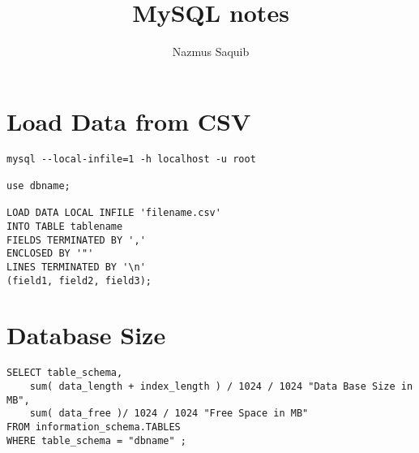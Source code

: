 \documentclass[12pt, a4paper]{article}
\begin{document}
\title{MySQL notes}
\author{Nazmus Saquib}

\maketitle
\tableofcontents

\section{Load Data from CSV}
\begin{verbatim}
mysql --local-infile=1 -h localhost -u root

use dbname;

LOAD DATA LOCAL INFILE 'filename.csv'
INTO TABLE tablename
FIELDS TERMINATED BY ','
ENCLOSED BY '"'
LINES TERMINATED BY '\n'
(field1, field2, field3);
\end{verbatim}

\section{Database Size}
\begin{verbatim}
SELECT table_schema,
    sum( data_length + index_length ) / 1024 / 1024 "Data Base Size in MB",
    sum( data_free )/ 1024 / 1024 "Free Space in MB"
FROM information_schema.TABLES
WHERE table_schema = "dbname" ; 
\end{verbatim}
\end{document}

